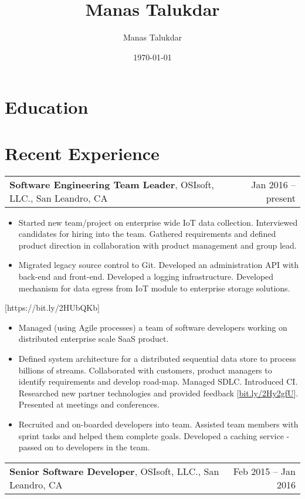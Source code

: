 \documentclass[letterpaper,10pt]{article}
\title{Manas Talukdar}
\author{Manas Talukdar}
\date{\today}
\makeatletter
\newcommand{\experienceItem}[3]{
	\begin{tabular*}{\textwidth}{c@{\extracolsep{\fill}}c}
		\multicolumn{1}{l}{\textbf{#1}, #2} & \multicolumn{1}{r}{#3}\\
	\end{tabular*}\vspace{-10pt}
}
\newcommand{\resumeItemListStart}{\begin{itemize}}
\newcommand{\resumeItemListEnd}{\end{itemize}}
\newcommand{\resumeListItem}[1]{
	\item{#1 \vspace{-6pt}}
}
\makeatother
\begin{document}
\thispagestyle{empty}
	
	
	
	
	
	\section{Education}	
	
	

	\section{Recent Experience}
	
	\experienceItem{Software Engineering Team Leader}{OSIsoft, LLC., San Leandro, CA}{Jan 2016 -- present}

	
	\resumeItemListStart
	\resumeListItem {Started new team/project on enterprise wide IoT data collection. Interviewed candidates for hiring into the team. Gathered requirements and defined product direction in collaboration with product management and group lead.}
	\resumeListItem {Migrated legacy source control to Git. Developed an administration API with back-end and front-end. Developed a logging infrastructure. Developed mechanism for data egress from IoT module to enterprise storage solutions.}
	\resumeItemListEnd

	[https://bit.ly/2HUbQKb]
	
	\resumeItemListStart
	\resumeListItem {Managed (using Agile processes) a team of software developers working on distributed enterprise scale SaaS product.}
	\resumeListItem {Defined system architecture for a distributed sequential data store to process billions of streams. Collaborated with customers, product managers to identify requirements and develop road-map. Managed SDLC. Introduced CI. Researched new partner technologies and provided feedback [\href{https://bit.ly/2Hy2gfU}{bit.ly/2Hy2gfU}]. Presented at meetings and conferences.}
	\resumeListItem {Recruited and on-boarded developers into team. Assisted team members with sprint tasks and helped them complete goals. Developed a caching service - passed on to developers in the team.}
	\resumeItemListEnd

	\experienceItem{Senior Software Developer}{OSIsoft, LLC., San Leandro, CA}{Feb 2015 -- Jan 2016}
	
\end{document}
